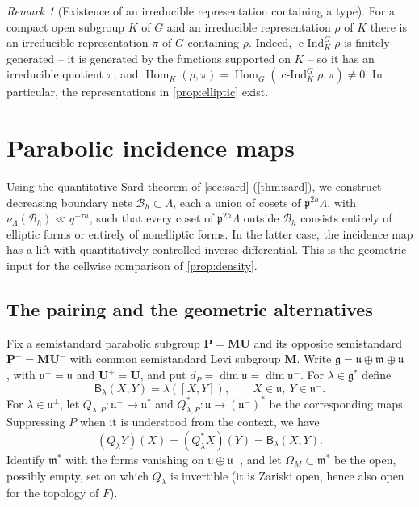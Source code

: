 \documentclass[11pt,reqno]{amsart}
\numberwithin{equation}{section}
\theoremstyle{plain}
\theoremstyle{definition}
\theoremstyle{remark}
\newtheorem{remark}[theorem]{Remark}
\theoremstyle{plain}
\newcommand{\pp}{\mathfrak{p}}   %
\newcommand{\Lat}{\mathcal{L}}   %
\newcommand{\dLat}{\Lambda}      %
\newcommand{\bG}{\mathbf{G}}     %
\newcommand{\bP}{\mathbf{P}}     %
\newcommand{\bM}{\mathbf{M}}     %
\newcommand{\bU}{\mathbf{U}}     %
\newcommand{\g}{\mathfrak{g}}    %
\newcommand{\gd}{\mathfrak{g}^*} %
\newcommand{\uu}{\mathfrak{u}}   %
\newcommand{\m}{\mathfrak{m}}    %
\newcommand{\Bad}{\mathcal{B}}   %
\newcommand{\bnets}{boundary nets}
\DeclareMathOperator{\Hom}{Hom}
\DeclareMathOperator{\cInd}{c-Ind}  %
\newcommand{\eexp}{\tau}
\newcommand{\lf}{\lambda}
\newcommand{\Bf}{\mathsf{B}}
\begin{document}
\begin{remark}[Existence of an irreducible representation containing a type]\label{rem:Ktype}
For a compact open subgroup $K$ of $G$ and an irreducible representation
$\rho$ of $K$ there is an irreducible representation $\pi$ of $G$
containing $\rho$. Indeed, $\cInd_K^G\rho$ is finitely generated -- it is generated by
the functions supported on $K$ -- so it has an irreducible quotient $\pi$, and $\Hom_K(\rho,\pi)=\Hom_G(\cInd_K^G\rho,\pi)\ne0$.
In particular, the representations in \cref{prop:elliptic} exist.
\end{remark}


\section{Parabolic incidence maps}\label{sec:incidence}

Using the quantitative Sard theorem of \cref{sec:sard} (\cref{thm:sard}), we
construct decreasing \bnets{} $\Bad_h\subset\dLat$, each a union of cosets of
$\pp^{2h}\dLat$, with $\nu_{\dLat}(\Bad_h)\ll q^{-\eexp h}$, such that every coset of
$\pp^{2h}\dLat$ outside $\Bad_h$ consists entirely of elliptic forms or
entirely of nonelliptic forms. In the latter case, the incidence map has a
lift with quantitatively controlled inverse differential. This is the
geometric input for the cellwise comparison of \cref{prop:density}.


\subsection{The pairing and the geometric alternatives}\label{sec:levi}
Fix a semistandard parabolic subgroup $\bP=\bM\bU$ and its opposite
semistandard $\bP^-=\bM\bU^-$ with common semistandard Levi subgroup $\bM$. Write
$\g=\uu\oplus\m\oplus\uu^-$, with $\uu^+=\uu$ and $\bU^+=\bU$,
and put $d_P=\dim\uu=\dim\uu^-$.
For $\lf\in\gd$ define
\begin{equation}\label{eq:levipairing}
\Bf_\lf(X,Y)=\lf([X,Y]),\qquad X\in\uu,\ Y\in\uu^-.
\end{equation}
For $\lf\in\uu^\perp$, let $Q_{\lf,P}:\uu^-\to\uu^*$ and $Q_{\lf,P}^*:\uu\to(\uu^-)^*$ be the corresponding maps.
Suppressing $P$ when it is understood from the context, we have
\begin{equation}\label{eq:pairing}
(Q_\lf Y)(X)=(Q_\lf^*X)(Y)=\Bf_\lf(X,Y).
\end{equation}
Identify $\m^*$ with the forms vanishing on $\uu\oplus\uu^-$, and let
$\Omega_M\subset\m^*$ be the open, possibly empty, set on which $Q_\lf$ is invertible
(it is Zariski open, hence also open for the topology of $F$).
\end{document}
